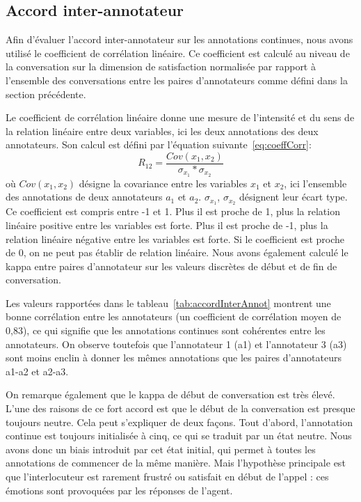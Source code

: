 \subsection{Accord inter-annotateur}
Afin d’évaluer l’accord inter-annotateur sur les annotations continues, nous avons utilisé le coefficient de corrélation linéaire. Ce coefficient est calculé au niveau de la conversation sur la dimension de satisfaction normalisée par rapport à l’ensemble des conversations entre les paires d’annotateurs comme défini dans la section précédente.

Le coefficient de corrélation linéaire donne une mesure de l'intensité et du sens de la relation linéaire entre deux variables, ici les deux annotations des deux annotateurs. Son calcul est défini par l'équation suivante~\ref{eq:coeffCorr}:
\begin{equation}
  R_{12} = \dfrac{Cov(x_1,x_2)}{\sigma_{x_1}*\sigma_{x_2}}
  \label{eq:coeffCorr}
\end{equation}
où $Cov(x_1,x_2)$ désigne la covariance entre les variables $x_1$ et $x_2$, ici l'ensemble des annotations de deux annotateurs $a_1$ et $a_2$. $\sigma_{x_1}$, $\sigma_{x_2}$ désignent leur écart type.
Ce coefficient est compris entre -1 et 1. Plus il est proche de 1, plus la relation linéaire positive entre les variables est forte. Plus il est proche de -1, plus la relation linéaire négative entre les variables est forte. Si le coefficient est proche de 0, on ne peut pas établir de relation linéaire.
Nous avons également calculé le kappa entre paires d'annotateur sur les valeurs discrètes de début et de fin de conversation.



Les valeurs rapportées dans le tableau~\ref{tab:accordInterAnnot} montrent une bonne corrélation entre les annotateurs (un coefficient de corrélation moyen de 0,83), ce qui signifie que les annotations continues sont cohérentes entre les annotateurs.
On observe toutefois que l'annotateur 1 (a1) et l'annotateur 3 (a3) sont moins enclin à donner les mêmes annotations que les paires d'annotateurs a1-a2 et a2-a3.

On remarque également que le kappa de début de conversation est très élevé. L’une des raisons de ce fort accord est que le début de la conversation est presque toujours neutre. Cela peut s’expliquer de deux façons. Tout d’abord, l’annotation continue est toujours initialisée à cinq, ce qui se traduit par un état neutre. Nous avons donc un biais introduit par cet état initial, qui permet à toutes les annotations de commencer de la même manière.
Mais l’hypothèse principale est que l’interlocuteur est rarement frustré ou satisfait en début de l’appel : ces émotions sont provoquées par les réponses de l’agent.

